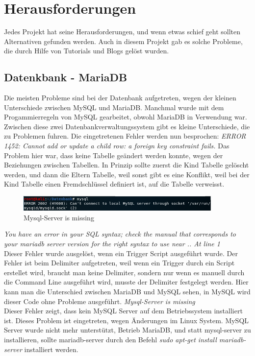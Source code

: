 \section{Herausforderungen}
Jedes Projekt hat seine Herausforderungen, und wenn etwas schief geht sollten Alternativen gefunden werden. Auch in diesem Projekt gab es solche Probleme, die durch Hilfe von Tutorials und Blogs gelöst wurden.
\subsection{Datenkbank - MariaDB}
Die meisten Probleme sind bei der Datenbank aufgetreten, wegen der kleinen Unterschiede zwischen MySQL und MariaDB. Manchmal wurde mit dem Progammierregeln von MySQL gearbeitet, obwohl MariaDB in Verwendung war. Zwischen diese zwei Datenbankverwaltungssystem gibt es kleine Unterschiede, die zu Problemen fuhren. Die eingetretenen Fehler werden nun besprochen:
\bigbreak
\textit{ERROR 1452: Cannot add or update a child row: a foreign key constraint fails.}
Das Problem hier war, dass keine Tabelle geändert werden konnte, wegen der Beziehungen zwischen Tabellen. In Prinzip sollte zuerst die Kind Tabelle gelöscht werden, und dann die Eltern Tabelle, weil sonst gibt es eine Konflikt, weil bei der Kind Tabelle einen Fremdschlüssel definiert ist, auf die Tabelle verweisst.
\bigbreak
\begin{figure}[ht]
  \centering
    \includegraphics[width=0.9\textwidth]{./figures/fehler1.png}
      \caption{Mysql-Server is missing}
\end{figure}
\textit{You have an error in your SQL syntax; check the manual that corresponds to your mariadb server version for the right syntax to use near .. At line 1}\\
Dieser Fehler wurde ausgelöst, wenn ein Trigger Script ausgeführt wurde. Der Fehler ist beim Delimiter aufgetreten, weil wenn ein Trigger durch ein Script erstellet wird, braucht man keine Delimiter, sondern nur wenn es manuell durch die Command Line ausgeführt wird, musste der Delimiter festgelegt werden. Hier kann man die Unterschied zwischen MariaDB und MySQL sehen, in MySQL wird dieser Code ohne Probleme ausgeführt.
\bigbreak
\textit{Mysql-Server is missing}\\
Dieser Fehler zeigt, dass kein MySQL Server auf dem Betriebssystem installiert ist. Dieses Problem ist eingetreten, wegen Änderungen im Linux System. MySQL Server wurde nicht mehr unterstützt, Betrieb MariaDB, und statt mysql-server zu installieren, sollte mariadb-server durch den Befehl \textit{sudo apt-get install mariadb-server} installiert werden.


